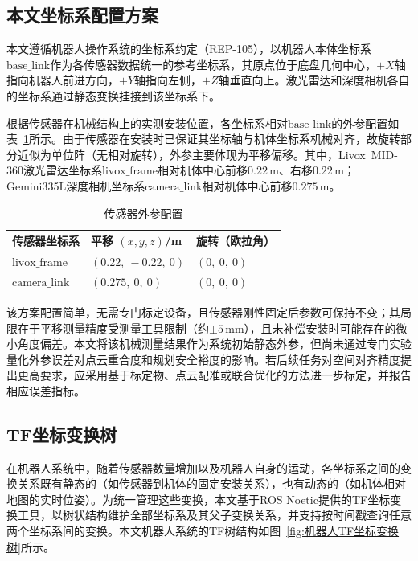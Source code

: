 \subsection{本文坐标系配置方案}
本文遵循机器人操作系统的坐标系约定（REP-105），以机器人本体坐标系$\mathrm{base\_link}$作为各传感器数据统一的参考坐标系，其原点位于底盘几何中心，$+X$轴指向机器人前进方向，$+Y$轴指向左侧，$+Z$轴垂直向上。激光雷达和深度相机各自的坐标系通过静态变换挂接到该坐标系下。

根据传感器在机械结构上的实测安装位置，各坐标系相对$\mathrm{base\_link}$的外参配置如表~\ref{tab:extrinsic_config}所示。由于传感器在安装时已保证其坐标轴与机体坐标系机械对齐，故旋转部分近似为单位阵（无相对旋转），外参主要体现为平移偏移。其中，Livox~MID-360激光雷达坐标系$\mathrm{livox\_frame}$相对机体中心前移$0.22\,\mathrm{m}$、右移$0.22\,\mathrm{m}$；Gemini335L深度相机坐标系$\mathrm{camera\_link}$相对机体中心前移$0.275\,\mathrm{m}$。

\begin{table}[!htb]
    \centering
    \caption{传感器外参配置}
    \label{tab:extrinsic_config}
    \renewcommand{\arraystretch}{1.4}
    \begin{tabularx}{0.9\textwidth}{>{\centering\arraybackslash}X >{\centering\arraybackslash}X >{\centering\arraybackslash}X}
        \toprule[1.2pt]
        \textbf{传感器坐标系} & \textbf{平移 $(x,y,z)$/m} & \textbf{旋转（欧拉角）} \\
        \midrule
        $\mathrm{livox\_frame}$ & $(0.22,\ -0.22,\ 0)$ & $(0,\ 0,\ 0)$ \\
        $\mathrm{camera\_link}$ & $(0.275,\ 0,\ 0)$ & $(0,\ 0,\ 0)$ \\
        \bottomrule[1.2pt]
    \end{tabularx}
\end{table}

该方案配置简单，无需专门标定设备，且传感器刚性固定后参数可保持不变；其局限在于平移测量精度受测量工具限制（约$\pm5\,\mathrm{mm}$），且未补偿安装时可能存在的微小角度偏差。本文将该机械测量结果作为系统初始静态外参，但尚未通过专门实验量化外参误差对点云重合度和规划安全裕度的影响。若后续任务对空间对齐精度提出更高要求，应采用基于标定物、点云配准或联合优化的方法进一步标定，并报告相应误差指标。

\subsection{TF坐标变换树}
在机器人系统中，随着传感器数量增加以及机器人自身的运动，各坐标系之间的变换关系既有静态的（如传感器到机体的固定安装关系），也有动态的（如机体相对地图的实时位姿）。为统一管理这些变换，本文基于ROS Noetic提供的TF坐标变换工具，以树状结构维护全部坐标系及其父子变换关系，并支持按时间戳查询任意两个坐标系间的变换。本文机器人系统的TF树结构如图~\ref{fig:机器人TF坐标变换树}所示。

